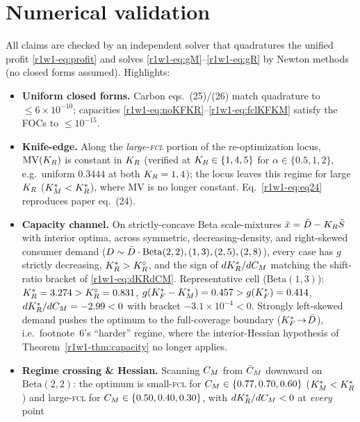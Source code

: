 \section{Numerical validation}\label{r1w1-sec:num}

All claims are checked by an independent solver that quadratures the unified
profit \eqref{r1w1-eq:profit} and solves \eqref{r1w1-eq:gM}--\eqref{r1w1-eq:gR} by Newton
methods (no closed forms assumed). Highlights:
\begin{itemize}[leftmargin=1.6em]
  \item \textbf{Uniform closed forms.} Carbon eqs.\ (25)/(26) match quadrature to
        $\le 6\times10^{-10}$; capacities \eqref{r1w1-eq:noKFKR}--\eqref{r1w1-eq:fclKFKM}
        satisfy the FOCs to $\le 10^{-15}$.
  \item \textbf{Knife-edge.} Along the \emph{large-\textsc{fcl}} portion of the
        re-optimization locus, $\mathrm{MV}(K_R)$ is constant in $K_R$ (verified at
        $K_R\in\{1,4,5\}$ for $\alpha\in\{0.5,1,2\}$, e.g.\ uniform $0.3444$ at
        both $K_R=1,4$); the locus leaves this regime for large $K_R$
        ($K_M^{*}<K_R^{*}$), where $\mathrm{MV}$ is no longer constant. Eq.\
        \eqref{r1w1-eq:eq24} reproduces paper eq.\ (24).
  \item \textbf{Capacity channel.} On strictly-concave Beta scale-mixtures
        $\tilde x=\tilde D-K_R\tilde S$ with interior optima, across symmetric,
        decreasing-density, and right-skewed consumer demand
        ($D\sim\bar D\cdot\mathrm{Beta}(2,2),(1,3),(2,5),(2,8)$), every case has
        $g$ strictly decreasing, $K_R^{*}>K_R^{\circ}$, and the sign of $dK_R^{*}/dC_M$
        matching the shift-ratio bracket of \eqref{r1w1-eq:dKRdCM}. Representative
        cell ($\mathrm{Beta}(1,3)$): $K_R^{*}=3.274>K_R^{\circ}=0.831$,
        $g(K_F^{*}-K_M^{*})=0.457>g(K_F^{*})=0.414$, $dK_R^{*}/dC_M=-2.99<0$ with bracket
        $-3.1\times10^{-4}<0$. Strongly left-skewed demand pushes the optimum to
        the full-coverage boundary ($K_F^{*}\!\to\!\bar D$), i.e.\ footnote~6's
        ``harder'' regime, where the interior-Hessian hypothesis of
        Theorem~\ref{r1w1-thm:capacity} no longer applies.
  \item \textbf{Regime crossing \& Hessian.} Scanning $C_M$ from $\bar C_M$ downward
        on $\mathrm{Beta}(2,2)$: the optimum is small-\textsc{fcl} for
        $C_M\in\{0.77,0.70,0.60\}$ ($K_M^{*}<K_R^{*}$) and large-\textsc{fcl} for
        $C_M\in\{0.50,0.40,0.30\}$, with $dK_R^{*}/dC_M<0$ at \emph{every} point

\end{itemize}
